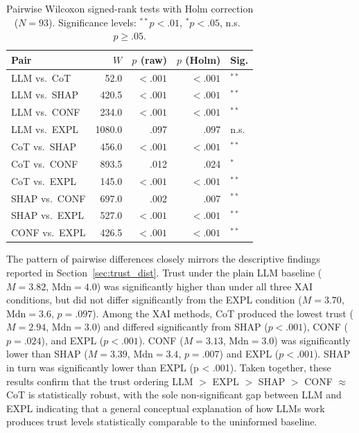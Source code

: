 \begin{table}[h]
\centering


\begin{tabular}{lrrrl}
\hline
\textbf{Pair} & \textbf{$W$} & \textbf{$p$ (raw)} & \textbf{$p$ (Holm)} & \textbf{Sig.} \\
\hline
LLM vs.\ CoT   &   52.0 & $<.001$ & $<.001$ & $^{**}$ \\
LLM vs.\ SHAP  &  420.5 & $<.001$ & $<.001$ & $^{**}$ \\
LLM vs.\ CONF  &  234.0 & $<.001$ & $<.001$ & $^{**}$ \\
LLM vs.\ EXPL  & 1080.0 &    .097 &    .097 & n.s.    \\
CoT vs.\ SHAP  &  456.0 & $<.001$ & $<.001$ & $^{**}$ \\
CoT vs.\ CONF  &  893.5 &    .012 &    .024 & $^{*}$  \\
CoT vs.\ EXPL  &  145.0 & $<.001$ & $<.001$ & $^{**}$ \\
SHAP vs.\ CONF &  697.0 &    .002 &    .007 & $^{**}$ \\
SHAP vs.\ EXPL &  527.0 & $<.001$ & $<.001$ & $^{**}$ \\
CONF vs.\ EXPL &  426.5 & $<.001$ & $<.001$ & $^{**}$ \\
\hline
\end{tabular}
\caption{Pairwise Wilcoxon signed-rank tests with Holm correction ($N = 93$).
Significance levels: $^{**}p < .01$, $^{*}p < .05$, n.s.\ $p \geq .05$.}
\label{tb:wilcoxon}
\end{table}
 
The pattern of pairwise differences closely mirrors the descriptive findings reported in
Section~\ref{sec:trust_dist}. Trust under the plain LLM baseline ($M = 3.82$,
$\text{Mdn} = 4.0$) was significantly higher than under all three XAI conditions, but did not
differ significantly from the EXPL condition ($M = 3.70$, $\text{Mdn} = 3.6$, $p = .097$).
Among the XAI methods, CoT produced the lowest trust ($M = 2.94$, $\text{Mdn} = 3.0$) and
differed significantly from SHAP ($p < .001$), CONF ($p = .024$), and EXPL ($p < .001$).
CONF ($M = 3.13$, $\text{Mdn} = 3.0$) was significantly lower than SHAP ($M = 3.39$,
$\text{Mdn} = 3.4$, $p =.007$) and EXPL ($p < .001$). SHAP in turn was significantly
lower than EXPL (p < .001). Taken together, these results confirm that the trust ordering
LLM $>$ EXPL $>$ SHAP $>$ CONF $\approx$ CoT is statistically robust, with the sole
non-significant gap between LLM and EXPL indicating that a general conceptual explanation
of how LLMs work produces trust levels statistically comparable to the uninformed baseline.

